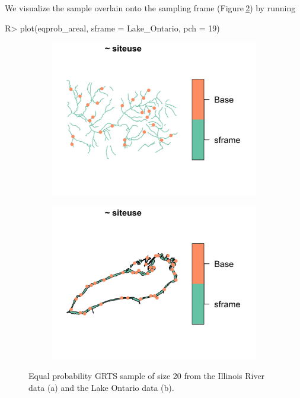 \documentclass[
  shortnames]{jss}
\begin{document}
We visualize the sample overlain onto the sampling frame
(Figure\(~\)\ref{fig:grts_ontario}) by running

\begin{CodeChunk}
\begin{CodeInput}
R> plot(eqprob_areal, sframe = Lake_Ontario, pch = 19)
\end{CodeInput}
\end{CodeChunk}

\begin{figure}
\centering
\begin{subfigure}{0.49\textwidth}
  \centering
  \includegraphics[width = 1\linewidth]{images/grts_illinois.jpeg}
  \caption{}
  \label{fig:grts_illinois}
\end{subfigure}
\begin{subfigure}{0.49\textwidth}
  \centering
  \includegraphics[width = 1\linewidth]{images/grts_ontario.jpeg}
  \caption{}
  \label{fig:grts_ontario}
\end{subfigure} 
\caption{Equal probability GRTS sample of size 20 from the Illinois River data (a) and the Lake Ontario data (b).}
\label{fig:lin_areal}
\end{figure}
\end{document}
